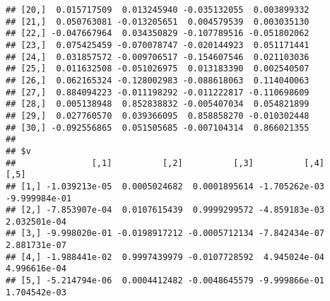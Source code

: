 \documentclass[
]{book}
\begin{document}
\begin{verbatim}
## [20,]  0.015717509  0.013245940 -0.035132055  0.003899332
## [21,]  0.050763081 -0.013205651  0.004579539  0.003035130
## [22,] -0.047667964  0.034350829 -0.107789516 -0.051802062
## [23,]  0.075425459 -0.070078747 -0.020144923  0.051171441
## [24,]  0.031857572 -0.009706517 -0.154607546  0.021103036
## [25,]  0.011632508 -0.051026975  0.013183390  0.002540507
## [26,]  0.062165324 -0.128002983 -0.088618063  0.114040063
## [27,]  0.884094223 -0.011198292 -0.011222817 -0.110698609
## [28,]  0.005138948  0.852838832 -0.005407034  0.054821899
## [29,]  0.027760570  0.039366095  0.858858270 -0.010302448
## [30,] -0.092556865  0.051505685 -0.007104314  0.866021355
## 
## $v
##               [,1]          [,2]          [,3]          [,4]          [,5]
## [1,] -1.039213e-05  0.0005024682  0.0001895614 -1.705262e-03 -9.999984e-01
## [2,] -7.853907e-04  0.0107615439  0.9999299572 -4.859183e-03  2.032501e-04
## [3,] -9.998020e-01 -0.0198917212 -0.0005712134 -7.842434e-07  2.881731e-07
## [4,] -1.988441e-02  0.9997439979 -0.0107728592  4.945024e-04  4.996616e-04
## [5,] -5.214794e-06  0.0004412482 -0.0048645579 -9.999866e-01  1.704542e-03
\end{verbatim}

  
\end{document}
